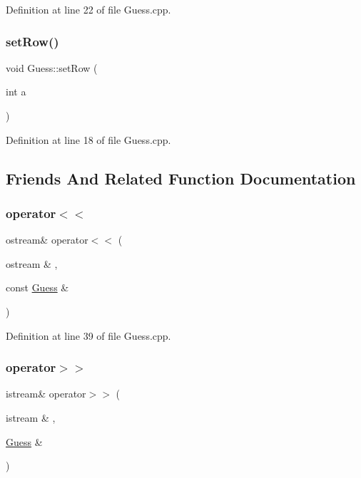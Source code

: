 Definition at line 22 of file Guess.\+cpp.

\mbox{\label{class_guess_a14824d1a22b6d0cb328adf5b052b9529}} 
\subsubsection{\texorpdfstring{set\+Row()}{setRow()}}
{\footnotesize\ttfamily void Guess\+::set\+Row (\begin{DoxyParamCaption}\item[{int}]{a }\end{DoxyParamCaption})}



Definition at line 18 of file Guess.\+cpp.



\subsection{Friends And Related Function Documentation}
\mbox{\label{class_guess_aa9dfccdd4605cf8faa55ddfa8d2c9745}} 
\subsubsection{\texorpdfstring{operator$<$$<$}{operator<<}}
{\footnotesize\ttfamily ostream\& operator$<$$<$ (\begin{DoxyParamCaption}\item[{ostream \&}]{,  }\item[{const \hyperlink{class_guess}{Guess} \&}]{ }\end{DoxyParamCaption})\hspace{0.3cm}{\ttfamily [friend]}}



Definition at line 39 of file Guess.\+cpp.

\mbox{\label{class_guess_a4248aa595b925941de244395ba77ba7c}} 
\subsubsection{\texorpdfstring{operator$>$$>$}{operator>>}}
{\footnotesize\ttfamily istream\& operator$>$$>$ (\begin{DoxyParamCaption}\item[{istream \&}]{,  }\item[{\hyperlink{class_guess}{Guess} \&}]{ }\end{DoxyParamCaption})\hspace{0.3cm}{\ttfamily [friend]}}



